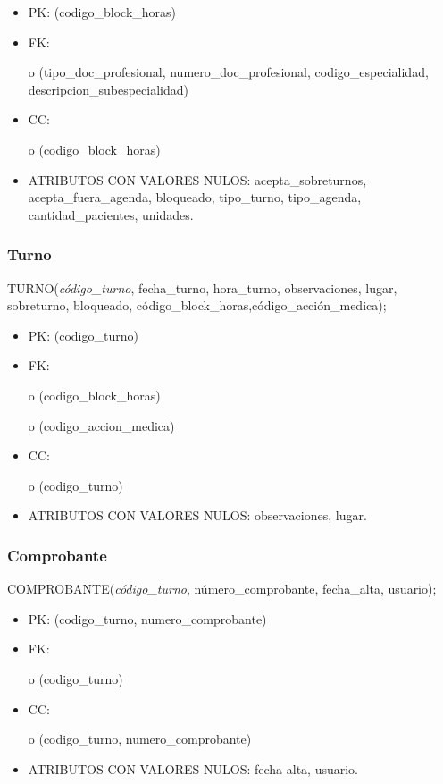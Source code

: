 \documentclass[a4paper,11pt]{article}
\begin{document}
\begin{itemize}
\item PK: (codigo\_block\_horas)

\item FK: 

o (tipo\_doc\_profesional, numero\_doc\_profesional, codigo\_especialidad, descripcion\_subespecialidad)

\item CC:

o (codigo\_block\_horas)

\item ATRIBUTOS CON VALORES NULOS: acepta\_sobreturnos, acepta\_fuera\_agenda, bloqueado, 
tipo\_turno, tipo\_agenda, cantidad\_pacientes, unidades.\label{HToc293405841}
\end{itemize}

\subsubsection{\textbf{Turno}}

TURNO(\emph{código\_turno}, fecha\_turno, hora\_turno, observaciones, lugar, sobreturno, 
bloqueado, código\_block\_horas,código\_acción\_medica);

\begin{itemize}
\item PK: (codigo\_turno)

\item FK: 

o (codigo\_block\_horas)

o (codigo\_accion\_medica)

\item CC:

o (codigo\_turno)

\item ATRIBUTOS CON VALORES NULOS:  observaciones, lugar.\label{HToc293405842}
\end{itemize}

\subsubsection{\textbf{Comprobante}}

COMPROBANTE(\emph{código\_turno}, número\_comprobante, fecha\_alta, usuario);

\begin{itemize}
\item PK: (codigo\_turno, numero\_comprobante)

\item FK: 

o (codigo\_turno)

\item CC:

o (codigo\_turno, numero\_comprobante)

\item ATRIBUTOS CON VALORES NULOS:  fecha alta, usuario.
\end{itemize}
\end{document}
